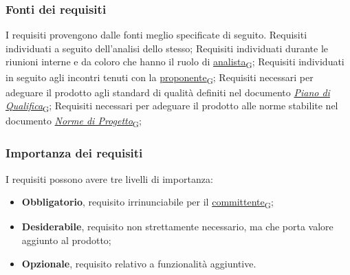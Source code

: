\newpage

\subsubsection{Fonti dei requisiti}
\label{sec:fonti_requisiti}
I requisiti provengono dalle fonti meglio specificate di seguito.
Requisiti individuati a seguito dell'analisi dello stesso;
Requisiti individuati durante le riunioni interne e da coloro che hanno il ruolo di \href{https://7last.github.io/docs/pb/documentazione-interna/glossario\#analista}{analista\textsubscript{G}};
Requisiti individuati in seguito agli incontri tenuti con la \href{https://7last.github.io/docs/pb/documentazione-interna/glossario\#proponente}{proponente\textsubscript{G}};
Requisiti necessari per adeguare il prodotto agli standard di qualità definiti nel documento \href{https://7last.github.io/docs/pb/documentazione-interna/glossario\#piano-di-qualifica}{\textit{Piano di Qualifica}\textsubscript{G}};
Requisiti necessari per adeguare il prodotto alle norme stabilite nel documento
\href{https://7last.github.io/docs/pb/documentazione-interna/glossario\#norme-di-progetto}{\textit{Norme di Progetto}\textsubscript{G}};


\subsubsection{Importanza dei requisiti}
\label{sec:importanza_requisiti}
I requisiti possono avere tre livelli di importanza:
\begin{itemize}
	\item \textbf{Obbligatorio}, requisito irrinunciabile per il \href{https://7last.github.io/docs/pb/documentazione-interna/glossario\#committente}{committente\textsubscript{G}};
	\item \textbf{Desiderabile}, requisito non strettamente necessario, ma che porta valore aggiunto al prodotto;
	\item \textbf{Opzionale}, requisito relativo a funzionalità aggiuntive.
\end{itemize}

